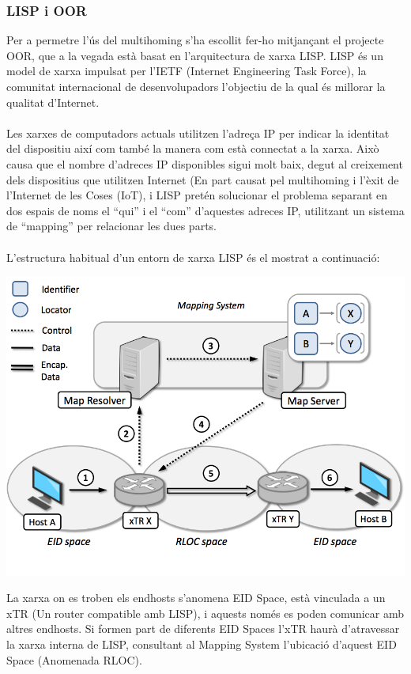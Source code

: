 \documentclass[11pt]{article}
\begin{document}
\subsubsection{LISP i OOR}
Per a permetre l’ús del multihoming s’ha escollit fer-ho mitjançant el projecte OOR, que a la vegada està basat en l’arquitectura de xarxa LISP.
LISP és un model de xarxa impulsat per l’IETF (Internet Engineering Task Force), la comunitat internacional de desenvolupadors l’objectiu de la qual és millorar la qualitat d’Internet. \\
\\
Les xarxes de computadors actuals utilitzen l’adreça IP per indicar la identitat del dispositiu així com també la manera com està connectat a la xarxa. Això causa que el nombre d’adreces IP disponibles sigui molt baix, degut al creixement dels dispositius que utilitzen Internet (En part causat pel multihoming i l’èxit de l’Internet de les Coses (IoT), i LISP pretén solucionar el problema separant en dos espais de noms el “qui” i el “com” d’aquestes adreces IP, utilitzant un sistema de “mapping” per  relacionar les dues parts.\\
\\
L’estructura habitual d’un entorn de xarxa LISP és el mostrat a continuació:
\begin{center}
\includegraphics[width=14cm]{lisp}
\end{center}
La xarxa on es troben els endhosts s’anomena EID Space, està vinculada a un xTR (Un router compatible amb LISP), i aquests només es poden comunicar amb altres endhosts. Si formen part de diferents EID Spaces l'xTR haurà d'atravessar la xarxa interna de LISP, consultant al Mapping System l'ubicació d'aquest EID Space (Anomenada RLOC).
\end{document}
